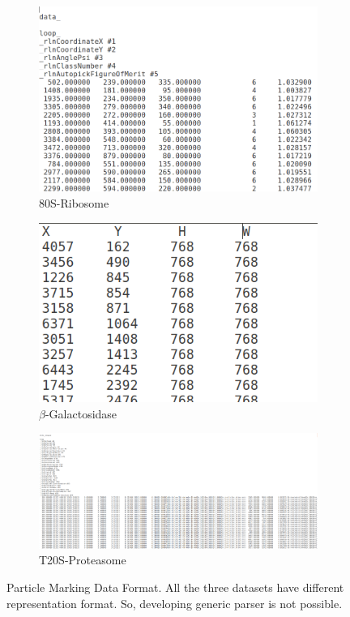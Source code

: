 \documentclass[twoside]{iitbreport}
\begin{document}
\begin{figure}[h]
\centering
\begin{subfigure}{.5\textwidth}
\centering
\includegraphics[width=0.5\linewidth]{marking-EM-10028.png}
\captionsetup{justification=centering}
\caption{ 80S-Ribosome }
\end{subfigure} 
\begin{subfigure}{.48\textwidth}
\centering
\includegraphics[width=0.5\linewidth]{marking-EM-10012.png}
\captionsetup{justification=centering}
\caption{$\beta$-Galactosidase}
\end{subfigure}
\begin{subfigure}{.8\textwidth}
\centering
\includegraphics[width=0.8\linewidth]{marking-EM-10025.png}
\captionsetup{justification=centering}
\caption{T20S-Proteasome}
\end{subfigure}
\captionsetup{justification=centering}
\caption{ Particle Marking Data Format. All the three datasets have different representation format. So, developing generic parser is not possible.}
\label{fig:Particle-Marking-Dataset}
\end{figure}
\end{document}
